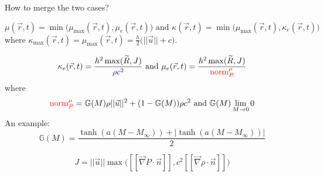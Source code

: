 \documentclass[xcolor=dvipsnames,10pt]{beamer}
\renewcommand{\Re}{\textrm{Re}}
\newcommand{\resi}{R}
\newcommand{\resinew}{\widetilde{\resi}}
\newcommand{\grad}{\vec{\nabla}}
\newcommand{\mbold}[1]{\boldsymbol#1}
\newcommand{\norm}{\textrm{norm}}
\newcommand{\tcr}[1]{\textcolor{red}{#1}}
\begin{document}
\begin{frame}{How to merge the two cases?}
%
\begin{block}{}
\begin{equation}
\mu(\vec{r},t)    = \min \Big (\mu_{\max}(\vec{r},t), \mu_e (\vec{r},t)    \Big) \text{  and  }
\kappa(\vec{r},t) = \min \Big (\mu_{\max}(\vec{r},t), \kappa_e (\vec{r},t) \Big ) \nonumber
\end{equation}
%
where
$\kappa_{\max}(\vec{r},t)  = \mu_{\max} (\vec{r},t) = \frac{h}{2} \Big ( ||\vec{u}|| + c \Big )$.
\end{block}
%
\begin{block}{}
%
\begin{equation}
\kappa_{e}(\vec{r},t) = \frac{h^2 \max(\resinew, J)}{ \textcolor{blue}{\rho c^2} }  \text{  and  }
\mu_{e}(\vec{r},t)    = \frac{h^2 \max(\resinew, J)}{ \textcolor{red}{\norm_P^\mu}} \nonumber
\end{equation}
%
where %
%
\begin{equation}
\textcolor{red}{\norm_P^\mu} = \mathbb{G}(M) \rho || \vec{u} ||^2 + (1-\mathbb{G}(M)) \rho c^2 \text{ and } \mathbb{G}(M) \lim_{M \to 0} 0\nonumber
\end{equation}
An example:
\begin{equation}
\mathbb{G}(M) = \frac{\tanh (a(M-M_\infty)) + |\tanh (a(M-M_\infty))|}{2} \nonumber
\end{equation}
\end{block}
%
% 
%
\begin{block}{}
\begin{equation}
J = || \vec{u} || \max \Big ( [[ \grad P \cdot \vec{n} ]], c^2 [[\grad \rho \cdot \vec{n}]] \Big) \nonumber
\end{equation}
\end{block}
\end{frame}
\end{document}
